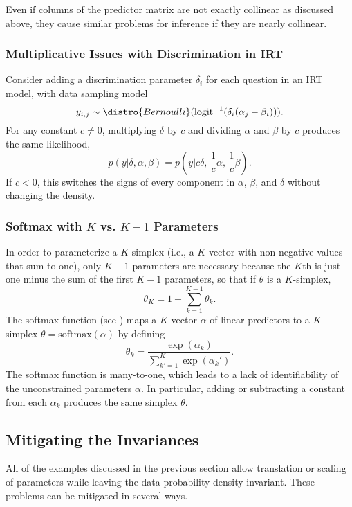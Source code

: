 Even if columns of the predictor matrix are not exactly collinear as
discussed above, they cause similar problems for inference if they are
nearly collinear.


\subsubsection{Multiplicative Issues with Discrimination in IRT}

Consider adding a discrimination parameter $\delta_i$ for each
question in an IRT model, with data sampling model
\[
y_{i, j} \sim \distro{Bernoulli}(\mbox{logit}^{-1}(\delta_i(\alpha_j - \beta_i))).
\]
For any constant $c \neq 0$, multiplying $\delta$ by $c$ and dividing
$\alpha$ and $\beta$ by $c$ produces the same likelihood,
\[
p(y|\delta,\alpha,\beta)
= p(y|c \delta, \, \frac{1}{c}\alpha, \, \frac{1}{c}\beta).
\]
If $c < 0$, this switches the signs of every component in $\alpha$,
$\beta$, and $\delta$ without changing the density.


\subsubsection{Softmax with $K$ vs. $K-1$ Parameters}

In order to parameterize a $K$-simplex (i.e., a $K$-vector with
non-negative values that sum to one), only $K - 1$ parameters are
necessary because the $K$th is just one minus the sum of the first $K
- 1$ parameters, so that if $\theta$ is a $K$-simplex,
%
\[
\theta_K = 1 - \sum_{k=1}^{K-1} \theta_k.
\]
%
The softmax function (see ) maps a $K$-vector
$\alpha$ of linear predictors to a $K$-simplex $\theta =
\mbox{softmax}(\alpha)$ by defining
%
\[
\theta_k = \frac{\exp(\alpha_k)}{\sum_{k'=1}^K \exp(\alpha_k')}.
\]
%
The softmax function is many-to-one, which leads to a lack of
identifiability of the unconstrained parameters $\alpha$.  In
particular, adding or subtracting a constant from each $\alpha_k$
produces the same simplex $\theta$. 



\subsection{Mitigating the Invariances}

All of the examples discussed in the previous section allow
translation or scaling of parameters while leaving the data
probability density invariant.  These problems can be mitigated in
several ways.

